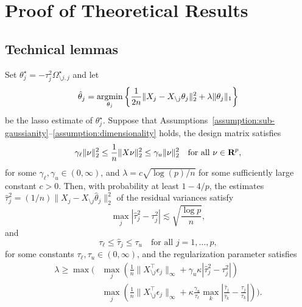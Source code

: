 \documentclass{article}
\begin{document}

\vskip 0.2in


\newpage

\appendix

\section{Proof of Theoretical Results}

\subsection{Technical lemmas}

\begin{lemma}\label{lemma:reg-param}    
Set $\theta_j^\star = -\tau_j^2 \Omega_{\setminus j, j}^\star$ and let
\[
    \hat \theta_j = \argmin_{\theta_j} \left\{\frac{1}{2n}\|X_j - X_{\setminus j} \theta_j\|_2^2 + \lambda \|\theta_j\|_1 \right\}
\]
be the lasso estimate of $\theta_j^\star$. Suppose that
Assumptions~\ref{assumption:sub-gaussianity}--\ref{assumption:dimensionality}
holds, the design matrix satisfies
\[
    \gamma_\ell \|\nu\|_2^2 \leq \frac{1}{n} \|X \nu\|_2^2 \leq \gamma_u \|\nu\|_2^2 \quad \text{for all } \nu \in {\mbox{\bf R}}^p,
\]
for some $\gamma_\ell, \gamma_u \in (0, \infty)$, and $\lambda = c \sqrt{\log(p)
/ n}$ for some sufficiently large constant $c > 0$. Then, with probability at
least $1 - 4/p$, the estimates $\hat \tau_j^2 = (1/n) \|X_j - X_{\setminus j}
\hat \theta_j\|_2^2$ of the residual variances satisfy
\begin{equation}\label{eq:var-estimation-error}
    \max_j |\hat \tau_j^2 - \tau_j^2| \lesssim \sqrt{\frac{\log p}{n}}, 
\end{equation}
and 
\begin{equation}\label{eq:var-estimates-bound}
    \tau_\ell \leq \hat \tau_j \leq \tau_u \quad \text{for all } j = 1, \dots, p,
\end{equation}
for some constants $\tau_\ell, \tau_u \in (0, \infty)$, and the regularization
parameter satisfies 
\begin{equation}\label{eq:reg-param-ineq}
    \begin{aligned}
        \lambda \geq \max\bigg(&\max_j \left(\frac{1}{n}\|X_{\setminus j}^\top \epsilon_j\|_\infty + \gamma_u \kappa |\hat \tau_j^2 - \tau_j^2|\right) \\
        &\max_j \left(\frac{1}{n}\|X_{\setminus j}^\top \epsilon_j\|_\infty + \kappa \frac{\gamma_u}{\tau_\ell} \max_k \left|\frac{\hat \tau_j}{\hat \tau_k} - \frac{\tau_j}{\tau_k}\right| \right)\bigg).                
    \end{aligned}
\end{equation}
\end{lemma}
\end{document}
